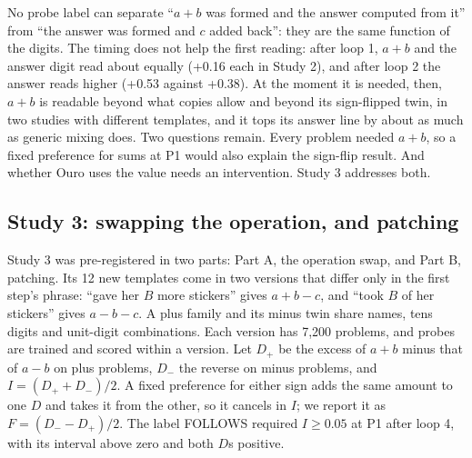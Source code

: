 \documentclass{article}
\begin{document}
No probe label can separate ``$a+b$ was formed and the answer computed from it'' from ``the answer was formed and $c$ added back'': they are the same function of the digits. The timing does not help the first reading: after loop 1, $a+b$ and the answer digit read about equally (+0.16 each in Study 2), and after loop 2 the answer reads higher (+0.53 against +0.38). At the moment it is needed, then, $a+b$ is readable beyond what copies allow and beyond its sign-flipped twin, in two studies with different templates, and it tops its answer line by about as much as generic mixing does. Two questions remain. Every problem needed $a+b$, so a fixed preference for sums at P1 would also explain the sign-flip result. And whether Ouro uses the value needs an intervention. Study 3 addresses both.

\subsection{Study 3: swapping the operation, and patching}\label{sec:study3}

Study 3 was pre-registered in two parts: Part A, the operation swap, and Part B, patching. Its 12 new templates come in two versions that differ only in the first step's phrase: ``gave her $B$ more stickers'' gives $a+b-c$, and ``took $B$ of her stickers'' gives $a-b-c$. A plus family and its minus twin share names, tens digits and unit-digit combinations. Each version has 7,200 problems, and probes are trained and scored within a version. Let $D_+$ be the excess of $a+b$ minus that of $a-b$ on plus problems, $D_-$ the reverse on minus problems, and $I = (D_+ + D_-)/2$. A fixed preference for either sign adds the same amount to one $D$ and takes it from the other, so it cancels in $I$; we report it as $F = (D_- - D_+)/2$. The label FOLLOWS required $I \geq 0.05$ at P1 after loop 4, with its interval above zero and both $D$s positive.
\end{document}

